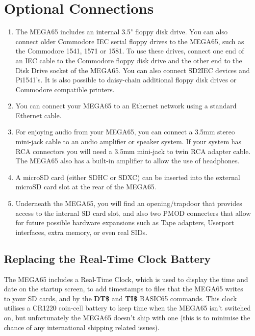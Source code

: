 \section{Optional Connections}
\begin{enumerate}
	\item The MEGA65 includes an internal 3.5" floppy disk drive. You can also connect older Commodore{\textregistered} IEC serial floppy drives to the MEGA65, such as the Commodore 1541, 1571 or 1581. To use these drives, connect one end of an IEC cable to the Commodore floppy disk drive and the other end to the Disk Drive socket of the MEGA65. You can also connect SD2IEC devices and Pi1541's. It is also possible to daisy-chain additional floppy disk drives or Commodore compatible printers.
	\item You can connect your MEGA65 to an Ethernet network using a standard Ethernet cable.
	\item For enjoying audio from your MEGA65, you can connect a 3.5mm stereo mini-jack cable to an audio amplifier or speaker system. If your system has RCA connectors you will need a 3.5mm mini-jack to twin RCA adapter cable. The MEGA65 also has a built-in amplifier to allow the use of headphones.
	\item A microSD card (either SDHC or SDXC) can be inserted into the external microSD card slot at the rear of the MEGA65.
    \item Underneath the MEGA65, you will find an opening/trapdoor that provides access to the internal SD card slot, and also two PMOD connecters that allow for future possible hardware expansions such as Tape adapters, Userport interfaces, extra memory, or even real SIDs.
\end{enumerate}

\subsection{Replacing the Real-Time Clock Battery}
The MEGA65 includes a Real-Time Clock, which is used to display the time and date on the startup screen, to add
timestamps to files that the MEGA65 writes to your SD cards, and by the {\bf DT\$} and {\bf TI\$} BASIC65 commands.
This clock utilises a CR1220 coin-cell battery to keep time when the MEGA65 isn't switched on, but unfortunately
the MEGA65 doesn't ship with one (this is to minimise the chance of any international shipping related issues).

